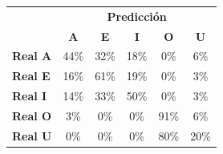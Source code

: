 \begin{tabular}{lccccc}
\toprule
 & \multicolumn{5}{c}{\textbf{Predicción}} \\
 & \textbf{A} & \textbf{E} & \textbf{I} & \textbf{O} & \textbf{U} \\
\midrule
\textbf{Real A} & \cellcolor[rgb]{0.69,0.69,1.00}  44\% & \cellcolor[rgb]{0.77,0.77,1.00}  32\% & \cellcolor[rgb]{0.88,0.88,1.00}  18\% & \cellcolor[rgb]{1.00,1.00,1.00}  0\% & \cellcolor[rgb]{0.96,0.96,1.00}  6\% \\
\textbf{Real E} & \cellcolor[rgb]{0.89,0.89,1.00}  16\% & \cellcolor[rgb]{0.57,0.57,1.00} \color{white} 61\% & \cellcolor[rgb]{0.86,0.86,1.00}  19\% & \cellcolor[rgb]{1.00,1.00,1.00}  0\% & \cellcolor[rgb]{0.98,0.98,1.00}  3\% \\
\textbf{Real I} & \cellcolor[rgb]{0.90,0.90,1.00}  14\% & \cellcolor[rgb]{0.77,0.77,1.00}  33\% & \cellcolor[rgb]{0.65,0.65,1.00} \color{white} 50\% & \cellcolor[rgb]{1.00,1.00,1.00}  0\% & \cellcolor[rgb]{0.98,0.98,1.00}  3\% \\
\textbf{Real O} & \cellcolor[rgb]{0.98,0.98,1.00}  3\% & \cellcolor[rgb]{1.00,1.00,1.00}  0\% & \cellcolor[rgb]{1.00,1.00,1.00}  0\% & \cellcolor[rgb]{0.36,0.36,1.00} \color{white} 91\% & \cellcolor[rgb]{0.96,0.96,1.00}  6\% \\
\textbf{Real U} & \cellcolor[rgb]{1.00,1.00,1.00}  0\% & \cellcolor[rgb]{1.00,1.00,1.00}  0\% & \cellcolor[rgb]{1.00,1.00,1.00}  0\% & \cellcolor[rgb]{0.44,0.44,1.00} \color{white} 80\% & \cellcolor[rgb]{0.86,0.86,1.00}  20\% \\
\bottomrule
\end{tabular}